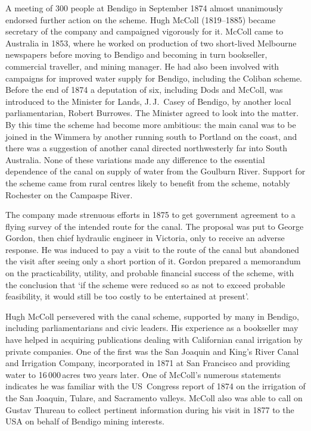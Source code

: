 A meeting of 300 people at Bendigo in September 1874 almost
unanimously endorsed further action on the scheme.  Hugh McColl
  (1819--1885) became secretary of the company and
campaigned vigorously for it.  McColl came to Australia in 1853, where
he worked on production of two short-lived Melbourne newspapers before
moving to Bendigo and becoming in turn bookseller, commercial
traveller, and mining manager.  He had also been involved with
campaigns for improved water supply for Bendigo, including the Coliban
scheme.  Before the end of 1874 a deputation of six, including Dods
and McColl, was introduced to the Minister for Lands, J.\,J.~Casey
 of Bendigo, by another local parliamentarian,
Robert Burrowes.   The Minister agreed to look
into the matter.  By this time the scheme had become more ambitious:
the main canal was to be joined in the Wimmera by another running
south to Portland on the coast, and there was a suggestion of another
canal directed northwesterly far
into South Australia.  None of these variations made any difference to
the essential dependence of the canal on supply of water from the
Goulburn River.  Support for the scheme came from rural centres likely
to benefit from the scheme, notably Rochester on the Campaspe River.

The company made strenuous efforts in 1875 to get government
ag\-reement to a flying survey of the intended route for the canal.
The proposal was put to George Gordon,  then chief
hydraulic engineer in Victoria, only to receive an adverse response.
He was induced to pay a visit to the route of the canal but abandoned
the visit after seeing only a short portion of it.  Gordon prepared a
memorandum on the practicability, utility, and probable
financial success of the scheme, with the conclusion
that `if the scheme were reduced so as not to exceed probable
feasibility, it would still be too costly to be entertained at
present'.

Hugh McColl persevered with the canal scheme,
supported by many in Bendigo, including parliamentarians and civic
leaders.  His experience as a bookseller may have helped in acquiring
publications dealing with Californian  canal
irrigation by private companies.  One of the first was the San Joaquin
and King's River Canal and Irrigation Company, incorporated in 1871 at
San Francisco and providing water to 16\,000\,acres two years later.
One of McColl's numerous statements indicates he was familiar with the
US~Congress report of 1874 on the irrigation of the San Joaquin,
Tulare, and Sacramento valleys.  McColl also was able to call on
Gustav Thureau  to collect pertinent information
during his visit in 1877 to the USA on behalf of
Bendigo mining interests.

